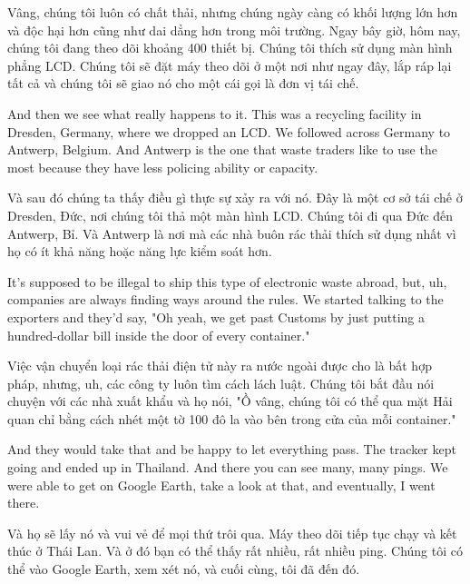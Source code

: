 \documentclass[a4paper]{article}
\begin{document}
	\begin{vietnamese-v2}
		Vâng, chúng tôi luôn có chất thải, nhưng chúng ngày càng có khối lượng lớn hơn và độc hại hơn cũng như dai dẳng hơn trong môi trường.
		Ngay bây giờ, hôm nay, chúng tôi đang theo dõi khoảng 400 thiết bị.
		Chúng tôi thích sử dụng màn hình phẳng LCD.
		Chúng tôi sẽ đặt máy theo dõi ở một nơi như ngay đây, lắp ráp lại tất cả và chúng tôi sẽ giao nó cho một cái gọi là đơn vị tái chế.
	\end{vietnamese-v2}
	
	And then we see what really happens to it.
	This was a recycling facility in Dresden, Germany, where we dropped an LCD.
	We followed across Germany to Antwerp, Belgium.
	And Antwerp is the one that waste traders like to use the most because they have less policing ability or capacity.
	
	\begin{vietnamese-v2}
		Và sau đó chúng ta thấy điều gì thực sự xảy ra với nó.
		Đây là một cơ sở tái chế ở Dresden, Đức, nơi chúng tôi thả một màn hình LCD.
		Chúng tôi đi qua Đức đến Antwerp, Bỉ.
		Và Antwerp là nơi mà các nhà buôn rác thải thích sử dụng nhất vì họ có ít khả năng hoặc năng lực kiểm soát hơn.
	\end{vietnamese-v2}
	
	It's supposed to be illegal to ship this type of electronic waste abroad, but, uh, companies are always finding ways around the rules.
	We started talking to the exporters and they'd say, "Oh yeah, we get past Customs by just putting a hundred-dollar bill inside the door of every container."
	
	\begin{vietnamese-v2}
		Việc vận chuyển loại rác thải điện tử này ra nước ngoài được cho là bất hợp pháp, nhưng, uh, các công ty luôn tìm cách lách luật.
		Chúng tôi bắt đầu nói chuyện với các nhà xuất khẩu và họ nói, "Ồ vâng, chúng tôi có thể qua mặt Hải quan chỉ bằng cách nhét một tờ 100 đô la vào bên trong cửa của mỗi container."
	\end{vietnamese-v2}
	
	And they would take that and be happy to let everything pass.
	The tracker kept going and ended up in Thailand.
	And there you can see many, many pings.
	We were able to get on Google Earth, take a look at that, and eventually, I went there.
	
	\begin{vietnamese-v2}
		Và họ sẽ lấy nó và vui vẻ để mọi thứ trôi qua.
		Máy theo dõi tiếp tục chạy và kết thúc ở Thái Lan.
		Và ở đó bạn có thể thấy rất nhiều, rất nhiều ping.
		Chúng tôi có thể vào Google Earth, xem xét nó, và cuối cùng, tôi đã đến đó.
	\end{vietnamese-v2}
	
\end{document}
